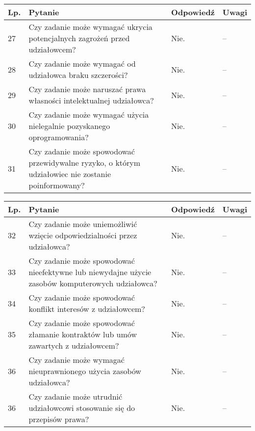 \documentclass[11pt,oneside,a4paper,titlepage,onecolumn]{article}
\begin{document}
\begin{tabularx}{\textwidth}{|l|X|l|X|}
    \hline
    Lp. & Pytanie & Odpowiedź & Uwagi \\ \hline

	27
	& Czy zadanie może wymagać ukrycia potencjalnych zagrożeń przed udziałowcem?
	& Nie.
	& --
	\\\hline

	28
	& Czy zadanie może wymagać od udziałowca braku szczerości?
	& Nie.
	& --
	\\\hline

	29
	& Czy zadanie może naruszać prawa własności intelektualnej udziałowca?
	& Nie.
	& --
	\\\hline

	30
	& Czy zadanie może wymagać użycia nielegalnie pozyskanego oprogramowania?
	& Nie.
	& --
	\\\hline

	31
	& Czy zadanie może spowodować przewidywalne ryzyko, o którym udziałowiec nie
    zostanie poinformowany?
	& Nie.
	& --
	\\\hline
\end{tabularx}
	
\begin{tabularx}{\textwidth}{|l|X|l|X|}
    \hline
    Lp. & Pytanie & Odpowiedź & Uwagi \\ \hline
    
	32
	& Czy zadanie może uniemożliwić wzięcie odpowiedzialności przez udziałowca?
	& Nie.
	& --
	\\\hline

	33
	& Czy zadanie może spowodować nieefektywne lub niewydajne użycie zasobów
    komputerowych udziałowca?
	& Nie.
	& --
	\\\hline

	34
	& Czy zadanie może spowodować konflikt interesów z udziałowcem?
	& Nie.
	& --
	\\\hline

	35
	& Czy zadanie może spowodować złamanie kontraktów lub umów zawartych z
    udziałowcem?
	& Nie.
	& --
	\\\hline

	36
	& Czy zadanie może wymagać nieuprawnionego użycia zasobów udziałowca?
	& Nie.
	& --
	\\\hline

	36
	& Czy zadanie może utrudnić udziałowcowi stosowanie się do przepisów prawa?
	& Nie.
	& --
	\\\hline
\end{tabularx}
    
\end{document}
